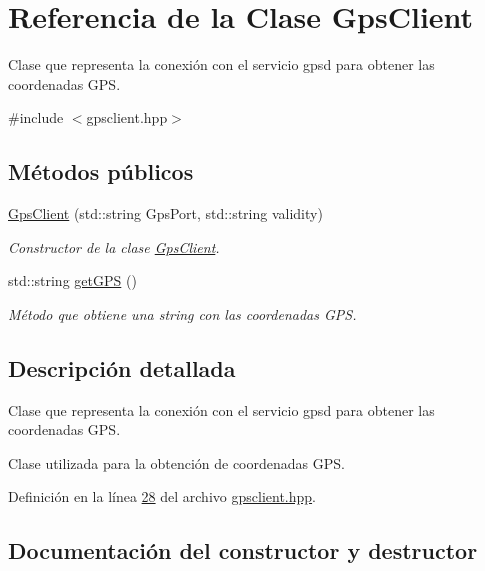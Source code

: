 \hypertarget{classGpsClient}{}\section{Referencia de la Clase Gps\+Client}
\label{classGpsClient}


Clase que representa la conexión con el servicio gpsd para obtener las coordenadas G\+PS.  




{\ttfamily \#include $<$gpsclient.\+hpp$>$}

\subsection*{Métodos públicos}
\begin{DoxyCompactItemize}
\item 
\hyperlink{classGpsClient_aabd8adfb2fd64e34abb77cdae5d60cb5}{Gps\+Client} (std\+::string Gps\+Port, std\+::string validity)
\begin{DoxyCompactList}\small\item\em Constructor de la clase \hyperlink{classGpsClient}{Gps\+Client}. \end{DoxyCompactList}\item 
std\+::string \hyperlink{classGpsClient_ace715e2b156d90e8d0b6cd1a91da4807}{get\+G\+PS} ()
\begin{DoxyCompactList}\small\item\em Método que obtiene una string con las coordenadas G\+PS. \end{DoxyCompactList}\end{DoxyCompactItemize}


\subsection{Descripción detallada}
Clase que representa la conexión con el servicio gpsd para obtener las coordenadas G\+PS. 

Clase utilizada para la obtención de coordenadas G\+PS. 

Definición en la línea \hyperlink{gpsclient_8hpp_source_l00028}{28} del archivo \hyperlink{gpsclient_8hpp_source}{gpsclient.\+hpp}.



\subsection{Documentación del constructor y destructor}
\mbox{\label{classGpsClient_aabd8adfb2fd64e34abb77cdae5d60cb5}} 
